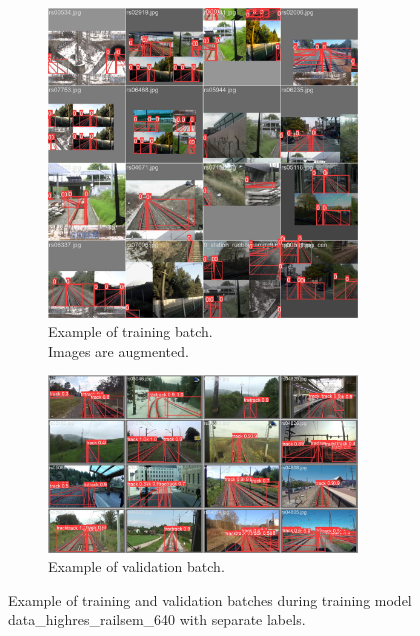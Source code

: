 \documentclass[Master,MDS,english]{BASE/twbook} %
\begin{document}
\begin{figure}[H]
\centering
\begin{subfigure}[t]{.5\textwidth}
  \centering
  \includegraphics[width=0.9\textwidth]{images/yolo/highres_nl/train_batch1}
  \caption{Example of training batch.\\ Images are augmented.}
  \label{fig:mosaic_augmentation_highres_nl}
\end{subfigure}%
\begin{subfigure}[t]{.5\textwidth}
  \centering
  \includegraphics[width=0.9\textwidth]{images/yolo/highres_nl/val_batch1_pred}
  \caption{Example of validation batch. }
\end{subfigure}
\caption{Example of training and validation batches during training model data\_highres\_railsem\_640 with separate labels.}
\label{fig:yolo_highres_example_nl}
\end{figure}
\end{document}
